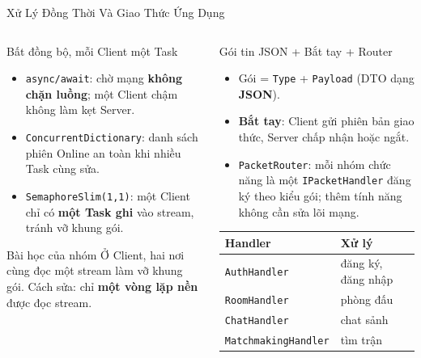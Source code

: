 \begin{frame}{Xử Lý Đồng Thời Và Giao Thức Ứng Dụng}
  \begin{columns}[T]
    \begin{column}{0.5\textwidth}
      \begin{block}{Bất đồng bộ, mỗi Client một Task}
        \begin{itemize}\setlength{\itemsep}{0pt}
          \item \texttt{async/await}: chờ mạng \textbf{không chặn luồng}; một Client chậm không làm kẹt Server.
          \item \texttt{ConcurrentDictionary}: danh sách phiên Online an toàn khi nhiều Task cùng sửa.
          \item \texttt{SemaphoreSlim(1,1)}: một Client chỉ có \textbf{một Task ghi} vào stream, tránh vỡ khung gói.
        \end{itemize}
      \end{block}
      \begin{alertblock}{Bài học của nhóm}
        Ở Client, hai nơi cùng đọc một stream làm vỡ khung gói. Cách sửa: chỉ \textbf{một vòng lặp nền} được đọc stream.
      \end{alertblock}
    \end{column}
    \begin{column}{0.46\textwidth}
      \begin{block}{Gói tin JSON \cite{ref2} + Bắt tay + Router}
        \begin{itemize}\setlength{\itemsep}{0pt}
          \item Gói = \texttt{Type} + \texttt{Payload} (DTO dạng \textbf{JSON}).
          \item \textbf{Bắt tay}: Client gửi phiên bản giao thức, Server chấp nhận hoặc ngắt.
          \item \texttt{PacketRouter}: mỗi nhóm chức năng là một \texttt{IPacketHandler} đăng ký theo kiểu gói; thêm tính năng không cần sửa lõi mạng.
        \end{itemize}
      \end{block}
      \scriptsize
      \begin{tabularx}{\textwidth}{@{}lY@{}}
        \toprule \textbf{Handler} & \textbf{Xử lý} \\ \midrule
        \texttt{AuthHandler} & đăng ký, đăng nhập \\
        \texttt{RoomHandler} & phòng đấu \\
        \texttt{ChatHandler} & chat sảnh \\
        \texttt{MatchmakingHandler} & tìm trận \\
        \bottomrule
      \end{tabularx}
    \end{column}
  \end{columns}
\end{frame}

